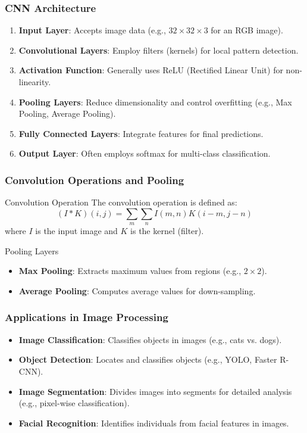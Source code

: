 \documentclass[aspectratio=169]{beamer}
\begin{document}
\begin{frame}[fragile]
    \frametitle{CNN Architecture}
    \begin{enumerate}
        \item \textbf{Input Layer}: Accepts image data (e.g., $32 \times 32 \times 3$ for an RGB image).
        \item \textbf{Convolutional Layers}: Employ filters (kernels) for local pattern detection.
        \item \textbf{Activation Function}: Generally uses ReLU (Rectified Linear Unit) for non-linearity.
        \item \textbf{Pooling Layers}: Reduce dimensionality and control overfitting (e.g., Max Pooling, Average Pooling).
        \item \textbf{Fully Connected Layers}: Integrate features for final predictions.
        \item \textbf{Output Layer}: Often employs softmax for multi-class classification.
    \end{enumerate}
\end{frame}

\begin{frame}[fragile]
    \frametitle{Convolution Operations and Pooling}
    \begin{block}{Convolution Operation}
        The convolution operation is defined as:
        \begin{equation}
            (I * K)(i, j) = \sum_m \sum_n I(m, n) K(i-m, j-n)
        \end{equation}
        where \( I \) is the input image and \( K \) is the kernel (filter).
    \end{block}
    
    \begin{block}{Pooling Layers}
        \begin{itemize}
            \item \textbf{Max Pooling}: Extracts maximum values from regions (e.g., $2 \times 2$).
            \item \textbf{Average Pooling}: Computes average values for down-sampling.
        \end{itemize}
    \end{block}
\end{frame}

\begin{frame}[fragile]
    \frametitle{Applications in Image Processing}
    \begin{itemize}
        \item \textbf{Image Classification}: Classifies objects in images (e.g., cats vs. dogs).
        \item \textbf{Object Detection}: Locates and classifies objects (e.g., YOLO, Faster R-CNN).
        \item \textbf{Image Segmentation}: Divides images into segments for detailed analysis (e.g., pixel-wise classification).
        \item \textbf{Facial Recognition}: Identifies individuals from facial features in images.
    \end{itemize}
\end{frame}
\end{document}
